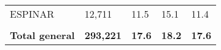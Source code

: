 \begin{tabular}{lllll}
	\cellcolor[HTML]{FF5050}ESPINAR                                & 12,711                                                                & 11.5                                                                             & 15.1                                                                        & 11.4                                                                                \\
	&                                                                       &                                                                                  &                                                                             &                                                                                     \\
	\rowcolor[HTML]{DDEBF7} 
	\textbf{Total   general}                                       & \textbf{293,221}                                                      & \textbf{17.6}                                                                    & \textbf{18.2}                                                               & \textbf{17.6}                                                                      
\end{tabular}